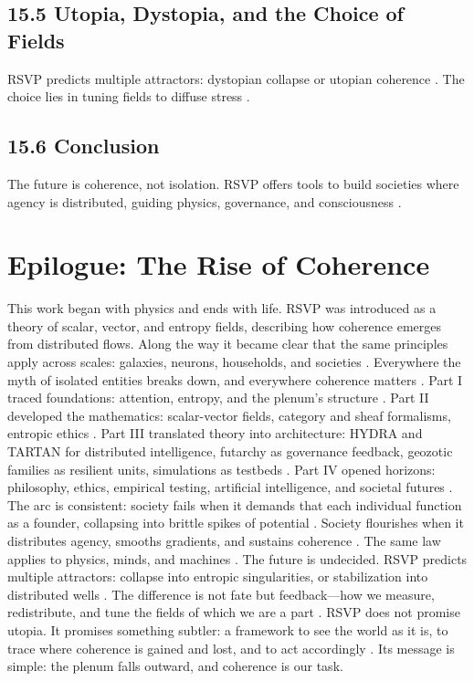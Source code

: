 \documentclass[12pt]{article}
\newcommand{\chap}[1]{%
  \section*{#1}%
  \addcontentsline{toc}{section}{#1}%
}
\begin{document}
\subsection*{15.5 Utopia, Dystopia, and the Choice of Fields}
RSVP predicts multiple attractors: dystopian collapse or utopian coherence \citep{zuboff2019}. The choice lies in tuning fields to diffuse stress \citep{deleuze1987}.

\subsection*{15.6 Conclusion}
The future is coherence, not isolation. RSVP offers tools to build societies where agency is distributed, guiding physics, governance, and consciousness \citep{whitehead1978}.

\chap{Epilogue: The Rise of Coherence}
This work began with physics and ends with life. RSVP was introduced as a theory of scalar, vector, and entropy fields, describing how coherence emerges from distributed flows. Along the way it became clear that the same principles apply across scales: galaxies, neurons, households, and societies \citep{gromov1999}. Everywhere the myth of isolated entities breaks down, and everywhere coherence matters \citep{whitehead1978}.
Part I traced foundations: attention, entropy, and the plenum's structure \citep{zuboff2019, shannon1948}. Part II developed the mathematics: scalar-vector fields, category and sheaf formalisms, entropic ethics \citep{maclane1998, lawvere2009}. Part III translated theory into architecture: HYDRA and TARTAN for distributed intelligence, futarchy as governance feedback, geozotic families as resilient units, simulations as testbeds \citep{bird1988, hanson2003}. Part IV opened horizons: philosophy, ethics, empirical testing, artificial intelligence, and societal futures \citep{ortega1957, tononi2004}.
The arc is consistent: society fails when it demands that each individual function as a founder, collapsing into brittle spikes of potential \citep{zuboff2019}. Society flourishes when it distributes agency, smooths gradients, and sustains coherence \citep{deleuze1987}. The same law applies to physics, minds, and machines \citep{baez2011}.
The future is undecided. RSVP predicts multiple attractors: collapse into entropic singularities, or stabilization into distributed wells \citep{hatcher2002}. The difference is not fate but feedback---how we measure, redistribute, and tune the fields of which we are a part \citep{hanson2003}. RSVP does not promise utopia. It promises something subtler: a framework to see the world as it is, to trace where coherence is gained and lost, and to act accordingly \citep{whitehead1978}. Its message is simple: the plenum falls outward, and coherence is our task.
\end{document}
